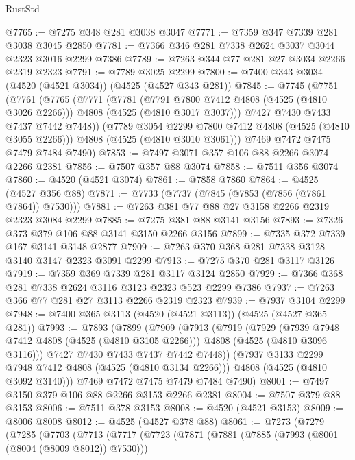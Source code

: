 \begin{lexlean}{RustStd}
\begin{coremodule}
{\begin{coremodule}
{{{{{{{{{{{{{{@7765 := @7275 @348 @281 @3038 @3047
@7771 := @7359 @347 @7339 @281 @3038 @3045 @2850
@7781 := @7366 @346 @281 @7338 @2624 @3037 @3044 @2323 @3016 @2299 @7386
@7789 := @7263 @344 @77 @281 @27 @3034 @2266 @2319 @2323
@7791 := @7789 @3025 @2299
@7800 := @7400 @343 @3034 (@4520 (@4521 @3034)) (@4525 (@4527 @343 @281))
@7845 := @7745
    (@7751
      (@7761
        (@7765
          (@7771
            (@7781
              (@7791 @7800 @7412 @4808 (@4525 (@4810 @3026 @2266)))
              @4808
              (@4525 (@4810 @3017 @3037)))
            @7427
            @7430
            @7433
            @7437
            @7442
            @7448))
        (@7789 @3054 @2299 @7800 @7412 @4808 (@4525 (@4810 @3055 @2266)))
        @4808
        (@4525 (@4810 @3010 @3061)))
      @7469
      @7472
      @7475
      @7479
      @7484
      @7490)
@7853 := @7497 @3071 @357 @106 @88 @2266 @3074 @2266 @2381
@7856 := @7507 @357 @88 @3074
@7858 := @7511 @356 @3074
@7860 := @4520 (@4521 @3074)
@7861 := @7858 @7860
@7864 := @4525 (@4527 @356 @88)
@7871 := @7733 (@7737 (@7845 (@7853 (@7856 (@7861 @7864)) @7530)))
@7881 := @7263 @381 @77 @88 @27 @3158 @2266 @2319 @2323 @3084 @2299
@7885 := @7275 @381 @88 @3141 @3156
@7893 := @7326 @373 @379 @106 @88 @3141 @3150 @2266 @3156
@7899 := @7335 @372 @7339 @167 @3141 @3148 @2877
@7909 := @7263 @370 @368 @281 @7338 @3128 @3140 @3147 @2323 @3091 @2299
@7913 := @7275 @370 @281 @3117 @3126
@7919 := @7359 @369 @7339 @281 @3117 @3124 @2850
@7929 := @7366 @368 @281 @7338 @2624 @3116 @3123 @2323 @523 @2299 @7386
@7937 := @7263 @366 @77 @281 @27 @3113 @2266 @2319 @2323
@7939 := @7937 @3104 @2299
@7948 := @7400 @365 @3113 (@4520 (@4521 @3113)) (@4525 (@4527 @365 @281))
@7993 := @7893
    (@7899
      (@7909
        (@7913
          (@7919
            (@7929
              (@7939 @7948 @7412 @4808 (@4525 (@4810 @3105 @2266)))
              @4808
              (@4525 (@4810 @3096 @3116)))
            @7427
            @7430
            @7433
            @7437
            @7442
            @7448))
        (@7937 @3133 @2299 @7948 @7412 @4808 (@4525 (@4810 @3134 @2266)))
        @4808
        (@4525 (@4810 @3092 @3140)))
      @7469
      @7472
      @7475
      @7479
      @7484
      @7490)
@8001 := @7497 @3150 @379 @106 @88 @2266 @3153 @2266 @2381
@8004 := @7507 @379 @88 @3153
@8006 := @7511 @378 @3153
@8008 := @4520 (@4521 @3153)
@8009 := @8006 @8008
@8012 := @4525 (@4527 @378 @88)
@8061 := @7273
    (@7279
      (@7285
        (@7703
          (@7713
            (@7717
              (@7723
                (@7871
                  (@7881
                    (@7885 (@7993 (@8001 (@8004 (@8009 @8012)) @7530)))
}}}}}}}}}}}}}}
\end{coremodule}}
\end{coremodule}
\end{lexlean}
